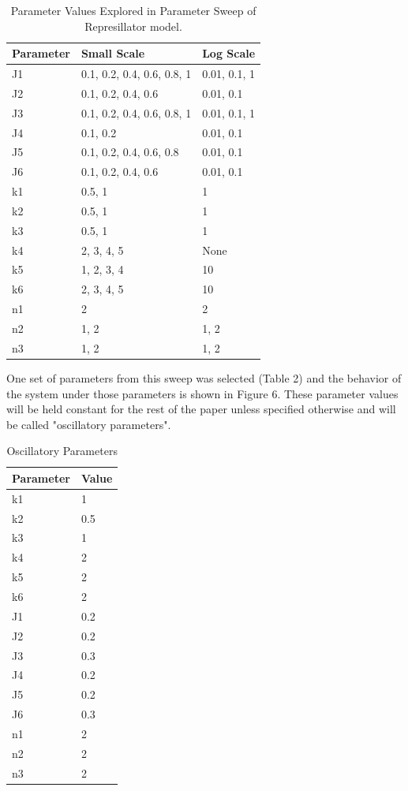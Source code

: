 \documentclass{article}
\begin{document}
\begin{table}[H]
\centering
\begin{tabular}{|l|l|l|}
\hline
\textbf{Parameter} & \textbf{Small Scale} &  \textbf{Log Scale} \\
\hline
J1 & 0.1, 0.2, 0.4, 0.6, 0.8, 1 & 0.01, 0.1, 1\\
J2 & 0.1, 0.2, 0.4, 0.6 & 0.01, 0.1\\
J3 & 0.1, 0.2, 0.4, 0.6, 0.8, 1 & 0.01, 0.1, 1\\
J4 & 0.1, 0.2 & 0.01, 0.1\\
J5 & 0.1, 0.2, 0.4, 0.6, 0.8 & 0.01, 0.1\\
J6 & 0.1, 0.2, 0.4, 0.6 & 0.01, 0.1\\
k1 & 0.5, 1 & 1\\
k2 & 0.5, 1 & 1\\
k3 & 0.5, 1 & 1\\
k4 & 2, 3, 4, 5 & None\\
k5 & 1, 2, 3, 4 & 10\\
k6 & 2, 3, 4, 5 & 10\\
n1 & 2 & 2\\
n2 & 1, 2 & 1, 2\\
n3 & 1, 2 & 1, 2\\
\hline
\end{tabular}
\caption{Parameter Values Explored in Parameter Sweep of Represillator model.}
\end{table}

One set of parameters from this sweep was selected (Table 2) and the behavior of the system under those parameters is shown in Figure 6. These parameter values will be held constant for the rest of the paper unless specified otherwise and will be called "oscillatory parameters". 

\begin{table}[H]
\centering
\begin{tabular}{|l|l|}
\hline
\textbf{Parameter} & \textbf{Value} \\
\hline
k1 & 1 \\
k2 & 0.5 \\
k3 & 1 \\
k4 & 2 \\
k5 & 2 \\
k6 & 2 \\
J1 & 0.2 \\
J2 & 0.2 \\
J3 & 0.3 \\
J4 & 0.2 \\
J5 & 0.2 \\
J6 & 0.3 \\
n1 & 2 \\
n2 & 2 \\
n3 & 2 \\
\hline
\end{tabular}
\caption{Oscillatory Parameters}
\end{table}
\end{document}
